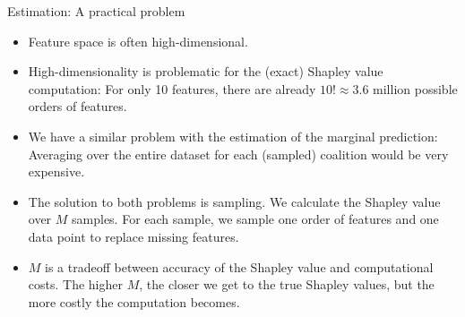 \documentclass[11pt,compress,t,notes=noshow, xcolor=table]{beamer}
\begin{document}
\begin{vbframe}{Estimation: A practical problem}
  \begin{itemize}
      \item Feature space is often high-dimensional.
      \item High-dimensionality is problematic for the (exact) Shapley value computation: For only 10 features, there are already $10! \approx 3.6$ million possible orders of features.
      \item We have a similar problem with the estimation of the marginal prediction: Averaging over the entire dataset for each (sampled) coalition would be very expensive.
      \item The solution to both problems is sampling. We calculate the Shapley value over $M$ samples. For each sample, we sample one order of features and one data point to replace missing features.
      \item $M$ is a tradeoff between accuracy of the Shapley value and computational costs. The higher $M$, the closer we get to the true Shapley values, but the more costly the computation becomes.
  \end{itemize}
\end{vbframe}

\newcommand{\xk}{\mathbf{x}^{(k)}}
\end{document}
